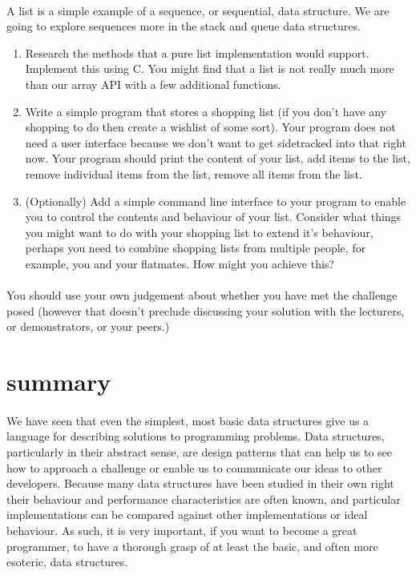 \documentclass[10pt, a4paper, twosize]{article}
\begin{document}
\paragraph{} A list is a simple example of a sequence, or sequential, data structure. We are going to explore sequences more in the stack and queue data structures.

\begin{enumerate}
\item Research the methods that a pure list implementation would support. Implement this using C. You might find that a list is not really much more than our array API with a few additional functions.
\item Write a simple program that stores a shopping list (if you don't have any shopping to do then create a wishlist of some sort). Your program does not need a user interface because we don't want to get sidetracked into that right now. Your program should print the content of your list, add items to the list, remove individual items from the list, remove all items from the list. 
\item (Optionally) Add a simple command line interface to your program to enable you to control the contents and behaviour of your list. Consider what things you might want to do with your shopping list to extend it's behaviour, perhaps you need to combine shopping lists from multiple people, for example, you and your flatmates. How might you achieve this?
\end{enumerate}

\paragraph{} You should use your own judgement about whether you have met the challenge posed (however that doesn't preclude discussing your solution with the lecturers, or demonstrators, or your peers.)


\section{summary}
\paragraph{} We have seen that even the simplest, most basic data structures give us a language for describing solutions to programming problems. Data structures, particularly in their abstract sense, are design patterns that can help us to see how to approach a challenge or enable us to communicate our ideas to other developers. Because many data structures have been studied in their own right their behaviour and performance characteristics are often known, and particular implementations can be compared against other implementations or ideal behaviour. As such, it is very important, if you want to become a great programmer, to have a thorough grasp of at least the basic, and often more esoteric, data structures.
\end{document}
